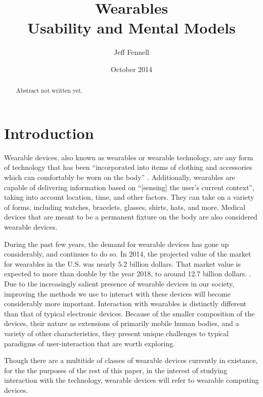 \documentclass[12pt]{article}
\begin{document}
\begin{abstract}
Abstract not written yet.

\end{abstract}

\title{Wearables \\ \vspace{2 mm} {\large Usability and Mental Models}}
\author{Jeff Fennell}
\date{October 2014}
\maketitle

\tableofcontents

\section{Introduction}
Wearable devices, also known as wearables or wearable technology, are any form of technology that has been ``incorporated into items of clothing and accessories which can comfortably be worn on the body'' \cite{wd}. Additionally, wearables are capable of delivering information based on ``[sensing] the user's current context'', taking into account location, time, and other factors\cite{star}. They can take on a variety of forms, including watches, bracelets, glasses, shirts, hats, and more. Medical devices that are meant to be a permanent fixture on the body are also considered wearable devices.

During the past few years, the demand for wearable devices has gone up considerably, and continues to do so. In 2014, the projected value of the market for wearables in the U.S. was nearly 5.2 billion dollars. That market value is expected to more than double by the year 2018, to around 12.7 billion dollars. \cite{wmv}. Due to the increasingly salient presence of wearable devices in our society, improving the methods we use to interact with these devices will become considerably more important. Interaction with wearables is distinctly different than that of typical electronic devices.  Because of the smaller composition of the devices, their nature as extensions of primarily mobile human bodies, and a variety of other characteristics, they present unique challenges to typical paradigms of user-interaction that are worth exploring.

Though there are a multitide of classes of wearable devices currently in existance, for the the purposes of the rest of this paper, in the interest of studying interaction with the technology, wearable devices will refer to wearable computing devices.
\end{document}
